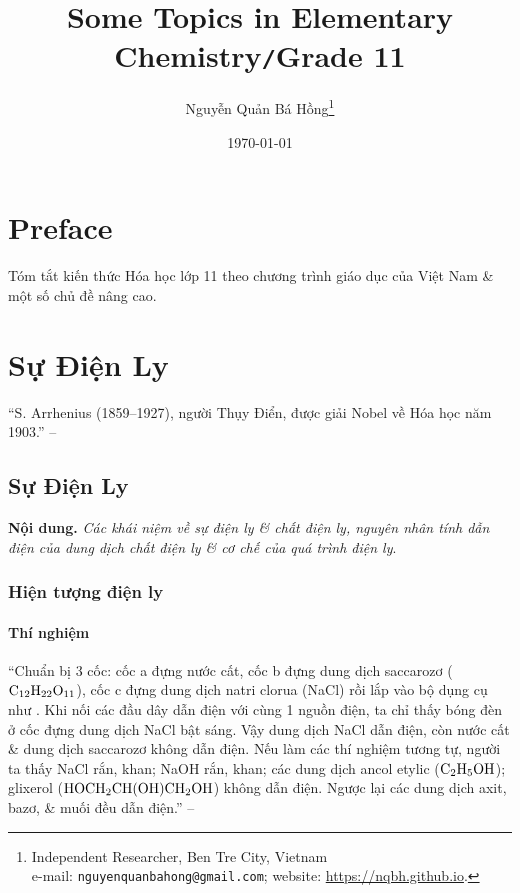 \documentclass[oneside]{book}
\title{Some Topics in Elementary Chemistry\texttt{/}Grade 11}
\author{Nguyễn Quản Bá Hồng\footnote{Independent Researcher, Ben Tre City, Vietnam\\e-mail: \texttt{nguyenquanbahong@gmail.com}; website: \url{https://nqbh.github.io}.}}
\date{\today}
\numberwithin{equation}{section}
\begin{document}
\frontmatter
\maketitle
\setcounter{secnumdepth}{4}
\setcounter{tocdepth}{3}
\tableofcontents
\newpage


\chapter*{Preface}

Tóm tắt kiến thức Hóa học lớp 11 theo chương trình giáo dục của Việt Nam \& một số chủ đề nâng cao.


\mainmatter

\chapter{Sự Điện Ly}

``S. Arrhenius (1859--1927), người Thụy Điển, được giải Nobel về Hóa học năm 1903.'' -- \cite[p. 3]{SGK_Hoa_Hoc_11_nang_cao}

\section{Sự Điện Ly}
\textbf{Nội dung.} \textit{Các khái niệm về sự điện ly \& chất điện ly, nguyên nhân tính dẫn điện của dung dịch chất điện ly \& cơ chế của quá trình điện ly}.

\subsection{Hiện tượng điện ly}

\subsubsection{Thí nghiệm}
``Chuẩn bị 3 cốc: cốc a đựng nước cất, cốc b đựng dung dịch saccarozơ ($\rm C_{12}H_{22}O_{11}$), cốc c đựng dung dịch natri clorua (NaCl) rồi lắp vào bộ dụng cụ như \cite[Hình 1.1: \textsf{Bộ dụng cụ chứng minh tính dẫn điện của dung dịch}, p. 4]{SGK_Hoa_Hoc_11_nang_cao}. Khi nối các đầu dây dẫn điện với cùng 1 nguồn điện, ta chỉ thấy bóng đèn ở cốc đựng dung dịch NaCl bật sáng. Vậy dung dịch NaCl dẫn điện, còn nước cất \& dung dịch saccarozơ không dẫn điện. Nếu làm các thí nghiệm tương tự, người ta thấy NaCl rắn, khan; NaOH rắn, khan; các dung dịch ancol etylic ($\rm C_2H_5OH$); glixerol ($\rm HOCH_2CH(OH)CH_2OH$) không dẫn điện. Ngược lại các dung dịch axit, bazơ, \& muối đều dẫn điện.'' -- \cite[p. 4]{SGK_Hoa_Hoc_11_nang_cao}
\end{document}
